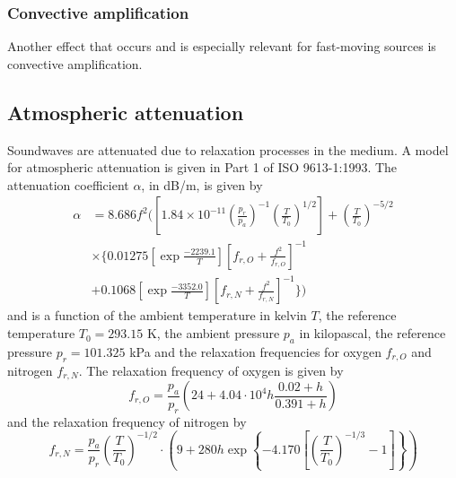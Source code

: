 \subsubsection{Convective amplification}
Another effect that occurs and is especially relevant for fast-moving sources is
convective amplification.

\cite{Dowling1976}








\subsection{Atmospheric attenuation}\label{sec:theory_sound_atmospheric_attenuation}
Soundwaves are attenuated due to relaxation processes in the medium.
A model for atmospheric attenuation is given in Part 1 of ISO 9613-1:1993\cite{ISO9613-1}.
The attenuation coefficient $\alpha$, in dB/m, is given by
\begin{align}\label{eq:theory:sound:atmospheric-attenuation}
 \alpha &= 8.686 f^2 \Biggl( \left[ 1.84 \times 10^{-11} \left(\frac{p_r}{p_a}\right)^{-1} \left(\frac{T}{T_0}\right)^{1/2} \right] + \left(\frac{T}{T_0}\right)^{-5/2} \nonumber \\ 
 &\times \Biggl\{ 0.01275 \left[ \exp{\frac{-2239.1}{T}} \right]  \left[f_{r,O} + \frac{f^2}{f_{r,O}} \right]^{-1} \nonumber \\
 &+ 0.1068 \left[ \exp{\frac{-3352.0}{T}} \right] \left[ f_{r,N} + \frac{f^2}{f_{r,N}} \right]^{-1} \Biggr\} \Biggr) 
\end{align}
and is a function of the ambient temperature in kelvin $T$, the reference
temperature $T_0=293.15$ K, the ambient pressure $p_a$ in kilopascal, the
reference pressure $p_r=101.325$ kPa and the relaxation frequencies for oxygen 
$f_{r,O}$ and nitrogen $f_{r,N}$.
The relaxation frequency of oxygen is given by
\begin{equation}
 f_{r,O} = \frac{p_a}{p_r} \left( 24 + 4.04 \cdot 10^4 h \frac{0.02 + h}{0.391 + h}  \right)
\end{equation}
and the relaxation frequency of nitrogen by
\begin{equation}
 f_{r,N} = \frac{p_a}{p_r} \left( \frac{T}{T_0} \right)^{-1/2} \cdot \left( 9 + 280 h \exp{\left\{ -4.170 \left[ \left(\frac{T}{T_0} \right)^{-1/3} -1 \right] \right\} } \right)
\end{equation}
